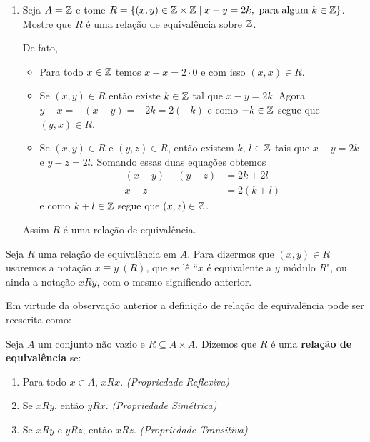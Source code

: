 \begin{exemplos}
\begin{enumerate}[label={\arabic*})]
		\item Seja $A = \mathbb{Z}$ e tome $R = \{(x,y)\in \mathbb{Z} \times \mathbb{Z} \mid x - y = 2k, \mbox{ para algum } k \in \mathbb{Z}\}$. Mostre que $R$
		é uma rela{\c c}{\~a}o de equival{\^e}ncia sobre $\mathbb{Z}$.
		\begin{solucao}
			De fato,
			\begin{itemize}
				\item Para todo $x\in\mathbb{Z}$ temos $x - x = 2\cdot0$ e com isso $(x,x) \in R$.
				\item Se $(x,y) \in R$ então existe $k \in \mathbb{Z}$ tal que $x - y = 2k$. Agora $y - x = -(x - y) = -2k = 2 (-k)$ 
				e como $-k \in \mathbb{Z}$ segue que $(y,x) \in R$.
				\item Se $(x,y) \in R$ e $(y,z) \in R$, então existem $k$, $l\in \mathbb{Z}$ tais que $x - y = 2k$ e $y - z = 2l$.
				Somando essas duas equações obtemos
				\begin{align*}
					(x - y) + (y - z) &= 2k + 2l\\
					x - z &= 2(k + l)
				\end{align*}
				e como $k + l \in \mathbb{Z}$ segue que $(x,z) \in \mathbb{Z}$.
			\end{itemize}
			Assim $R$ é uma relação de equivalência.
		\end{solucao}
	\end{enumerate}
\end{exemplos}
\begin{observacao}
	Seja $R$ uma rela{\c c}{\~a}o de equival{\^e}ncia em $A$. Para dizermos que $(x,y) \in R$ usaremos a nota{\c c}{\~a}o $x\equiv y\ (R)$, que se l{\^e} ``$x$ é equivalente a $y$ m{\'o}dulo $R$", ou ainda a nota{\c c}{\~a}o $xRy$, com o mesmo significado anterior.
\end{observacao}

Em virtude da observação anterior a definição de relação de equivalência pode ser reescrita como:

\begin{definicao}
	Seja $A$ um conjunto n{\~a}o vazio e $R\subseteq A \times A$. Dizemos que $R$ {\'e} uma \textbf{rela{\c c}{\~a}o de equival{\^e}ncia} se:
	\begin{enumerate}[label={\roman*})]
		\item Para todo $x \in A$, $xRx$. \textit{(Propriedade Reflexiva)}
		\item Se $xRy$, então $yRx$. \textit{(Propriedade Simétrica)}
		\item Se $xRy$ e $yRz$, então $xRz$. \textit{(Propriedade Transitiva)}
	\end{enumerate}
\end{definicao}

